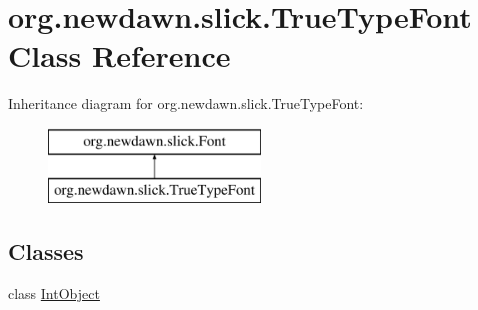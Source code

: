 \hypertarget{classorg_1_1newdawn_1_1slick_1_1_true_type_font}{}\section{org.\+newdawn.\+slick.\+True\+Type\+Font Class Reference}
\label{classorg_1_1newdawn_1_1slick_1_1_true_type_font}
Inheritance diagram for org.\+newdawn.\+slick.\+True\+Type\+Font\+:\begin{figure}[H]
\begin{center}
\leavevmode
\includegraphics[height=2.000000cm]{classorg_1_1newdawn_1_1slick_1_1_true_type_font}
\end{center}
\end{figure}
\subsection*{Classes}
\begin{DoxyCompactItemize}
\item 
class \mbox{\hyperlink{classorg_1_1newdawn_1_1slick_1_1_true_type_font_classorg_1_1newdawn_1_1slick_1_1_true_type_font_1_1_int_object}{Int\+Object}}
\end{DoxyCompactItemize}
